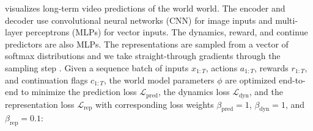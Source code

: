 
 visualizes long-term video predictions of the world world.
The encoder and decoder use convolutional neural networks (CNN) for image inputs and multi-layer perceptrons (MLPs) for vector inputs.
The dynamics, reward, and continue predictors are also MLPs.
The representations are sampled from a vector of softmax distributions and we take straight-through gradients through the sampling step \citep{bengio2013straight,hafner2020dreamerv2}.
Given a sequence batch of inputs $x_{1:T}$, actions $a_{1:T}$, rewards $r_{1:T}$, and continuation flags $c_{1:T}$, the world model parameters $\phi$ are optimized end-to-end to minimize the prediction loss $\mathcal{L}_{\mathrm{pred}}$, the dynamics loss $\mathcal{L}_{\mathrm{dyn}}$, and the representation loss $\mathcal{L}_{\mathrm{rep}}$ with corresponding loss weights $\beta_{\mathrm{pred}}=1$, $\beta_{\mathrm{dyn}}=1$, and $\beta_{\mathrm{rep}}=0.1$:


